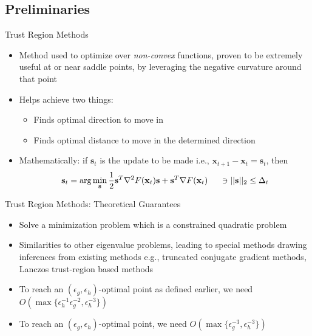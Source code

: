 \documentclass{beamer}
\newcommand{\h}{\nabla^{2}}
\newcommand{\g}{\nabla}
\newcommand{\xbold}{\mathbf{x}}
\begin{document}
\subsection{Preliminaries}
\begin{frame}{Trust Region Methods}
\begin{itemize}
\item<1->{Method used to optimize over \emph{non-convex} functions, proven to be extremely useful at or near saddle points, by leveraging the negative curvature around that point}
\item<2->{Helps achieve two things:
  \begin{itemize}
    \item<3->Finds optimal direction to move in
    \item<4->Finds optimal distance to move in the determined direction
  \end{itemize}
  }
\item<5->{Mathematically: if \(\mathbf{s}_{t}\) is the update to be made i.e., \(\xbold_{t+1} - \xbold_{t} = \mathbf{s}_{t}\), then
\begin{equation}
\label{TR}
\mathbf{s}_{t} = \text{arg}\min_{\mathbf{s}} \frac{1}{2}\mathbf{s}^{T} \h F(\xbold_{t}) \mathbf{s} + \mathbf{s}^{T} \g F(\xbold_{t}) \hspace{5mm}\ni ||\mathbf{s}||_{2} \leq \Delta_{t}
\end{equation} %
}
\end{itemize}
\end{frame}

\begin{frame}{Trust Region Methods: Theoretical Guarantees}
\begin{itemize}
\item<1->{Solve a minimization problem which is a constrained quadratic problem}
\item<2->{Similarities to other eigenvalue problems, leading to special methods drawing inferences from existing methods e.g., truncated conjugate gradient methods, Lanczos trust-region based methods}
\item<3->{To reach an \((\epsilon_{g}, \epsilon_{h})\)-optimal point as defined earlier, we need \(O\left(\max\{\epsilon_{h}^{-1}\epsilon_{g}^{-2}, \epsilon_{h}^{-3}\}\right)\)} %
\item<4->{To reach an \((\epsilon_{g}, \epsilon_{h})\)-optimal point, we need \(O\left(\max\{\epsilon_{g}^{-3}, \epsilon_{h}^{-3}\}\right)\)} %
\end{itemize}
\end{frame}
\end{document}
